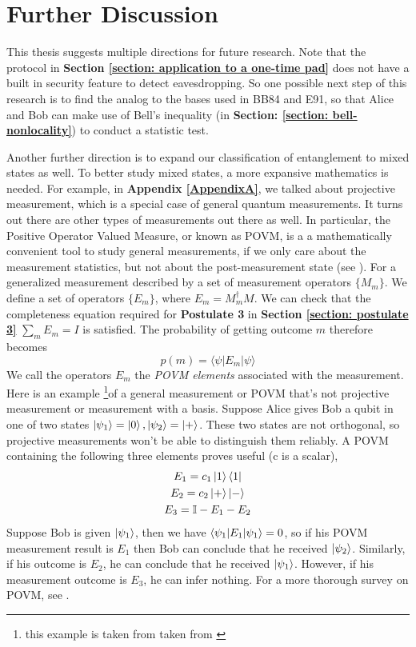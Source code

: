 
\chapter{Further Discussion} %

\label{Chapter7-further discussion} %

This thesis suggests multiple directions for future research. 
Note that the protocol in \textbf{Section \ref{section: application to a one-time pad}} does not have a built in security feature to detect eavesdropping. So one possible next step of this research is to find the analog to the bases used in BB84 and E91, so that Alice and Bob can make use of Bell's inequality (in \textbf{Section: \ref{section: bell-nonlocality}}) to conduct a statistic test.

Another further direction is to expand our classification of entanglement to mixed states as well. To better study mixed states, a more expansive mathematics is needed. For example, in \textbf{Appendix \ref{AppendixA}}, we talked about projective measurement, which is a special case of general quantum measurements. It turns out there are other types of measurements out there as well. In particular, the Positive Operator Valued Measure, or known as POVM, is a a mathematically convenient tool to study general measurements, if we only care about the measurement statistics, but not about the post-measurement state (see \cite{Nielsen}). For a generalized measurement described by a set of measurement operators $\{M_m\}$. We define a set of operators $\{{E_m}\}$, where
$E_m=M_m^\dagger M$. We can check that the completeness equation required for \textbf{Postulate 3} in \textbf{Section \ref{section: postulate 3}} $\sum_m E_m=I$ is satisfied. The probability of getting outcome $m$ therefore becomes 
$$p(m)=\langle \psi | E_m | \psi \rangle$$
We call the operators ${{E_m}}$ the \textit{POVM elements} associated with the measurement.
Here is an example \footnote{this example is taken from taken from \cite{Nielsen}}of a general measurement or POVM that's not projective measurement or measurement with a basis. Suppose Alice gives Bob a qubit in one of two states $\ket{\psi_1}=\ket{0}, \ket{\psi_2}=\ket{+}$. These two states are not orthogonal, so projective measurements won't be able to distinguish them reliably. A POVM containing the following three elements proves useful (c is a scalar),
\begin{gather}
    E_1=c_1\ket{1}\bra{1}\\
    E_2=c_2\ket{+}\ket{-}\\
    E_3=\mathbb{I}-E_1-E_2
\end{gather}
Suppose Bob is given $\ket{\psi_1}$, then we have $\braket{\psi_1|E_1|\psi_1}=0$, so if his POVM measurement result is $E_1$ then Bob can conclude that he received $\ket{\psi_2}$. Similarly, if his outcome is $E_2$, he can conclude that he received $\ket{\psi_1}$. However, if his measurement outcome is $E_3$, he can infer nothing. For a more thorough survey on POVM, see \cite{brandt1999positive}.


